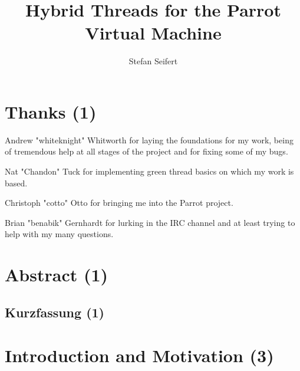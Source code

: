\documentclass[bachelor,english]{hgbthesis}
\begin{document}
\title{Hybrid Threads for the Parrot Virtual Machine}

\author{Stefan Seifert}


\frontmatter
\maketitle
\tableofcontents

\chapter{Thanks (1)}

Andrew "whiteknight" Whitworth for laying the foundations for my work, being of tremendous help at all stages of the project and for fixing some of my bugs.

Nat "Chandon" Tuck for implementing green thread basics on which my work is based.

Christoph "cotto" Otto for bringing me into the Parrot project.

Brian "benabik" Gernhardt for lurking in the IRC channel and at least trying to help with my many questions.

\chapter{Abstract (1)}

\begin{german}
\chapter{Kurzfassung (1)}
\end{german}

\mainmatter

\chapter{Introduction and Motivation (3)}
\end{document}
